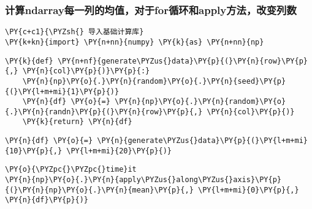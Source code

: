     \hypertarget{ux8ba1ux7b97ndarrayux6bcfux4e00ux5217ux7684ux5747ux503cux5bf9ux4e8eforux5faaux73afux548capplyux65b9ux6cd5ux6539ux53d8ux5217ux6570}{%
\subsubsection{计算ndarray每一列的均值，对于for循环和apply方法，改变列数}\label{ux8ba1ux7b97ndarrayux6bcfux4e00ux5217ux7684ux5747ux503cux5bf9ux4e8eforux5faaux73afux548capplyux65b9ux6cd5ux6539ux53d8ux5217ux6570}}

    \begin{tcolorbox}[breakable, size=fbox, boxrule=1pt, pad at break*=1mm,colback=cellbackground, colframe=cellborder]
\begin{Verbatim}[commandchars=\\\{\}]
\PY{c+c1}{\PYZsh{} 导入基础计算库}
\PY{k+kn}{import} \PY{n+nn}{numpy} \PY{k}{as} \PY{n+nn}{np}
\end{Verbatim}
\end{tcolorbox}

    \begin{tcolorbox}[breakable, size=fbox, boxrule=1pt, pad at break*=1mm,colback=cellbackground, colframe=cellborder]
\begin{Verbatim}[commandchars=\\\{\}]
\PY{k}{def} \PY{n+nf}{generate\PYZus{}data}\PY{p}{(}\PY{n}{row}\PY{p}{,} \PY{n}{col}\PY{p}{)}\PY{p}{:}
    \PY{n}{np}\PY{o}{.}\PY{n}{random}\PY{o}{.}\PY{n}{seed}\PY{p}{(}\PY{l+m+mi}{1}\PY{p}{)}
    \PY{n}{df} \PY{o}{=} \PY{n}{np}\PY{o}{.}\PY{n}{random}\PY{o}{.}\PY{n}{randn}\PY{p}{(}\PY{n}{row}\PY{p}{,} \PY{n}{col}\PY{p}{)}
    \PY{k}{return} \PY{n}{df}
\end{Verbatim}
\end{tcolorbox}

    \begin{tcolorbox}[breakable, size=fbox, boxrule=1pt, pad at break*=1mm,colback=cellbackground, colframe=cellborder]
\begin{Verbatim}[commandchars=\\\{\}]
\PY{n}{df} \PY{o}{=} \PY{n}{generate\PYZus{}data}\PY{p}{(}\PY{l+m+mi}{10}\PY{p}{,} \PY{l+m+mi}{20}\PY{p}{)}
\end{Verbatim}
\end{tcolorbox}

    \begin{tcolorbox}[breakable, size=fbox, boxrule=1pt, pad at break*=1mm,colback=cellbackground, colframe=cellborder]
\begin{Verbatim}[commandchars=\\\{\}]
\PY{o}{\PYZpc{}\PYZpc{}time}it
\PY{n}{np}\PY{o}{.}\PY{n}{apply\PYZus{}along\PYZus{}axis}\PY{p}{(}\PY{n}{np}\PY{o}{.}\PY{n}{mean}\PY{p}{,} \PY{l+m+mi}{0}\PY{p}{,} \PY{n}{df}\PY{p}{)}
\end{Verbatim}
\end{tcolorbox}

